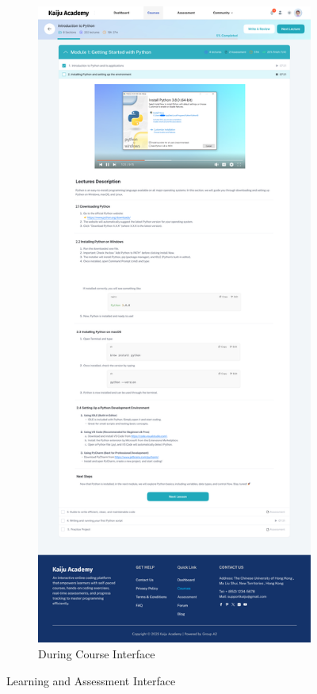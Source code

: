\documentclass[a4paper, 11pt]{scrreprt}
\begin{document}
\begin{figure}[ht]
\begin{subfigure}[b]{0.32\textwidth}
        \includegraphics[width=\textwidth]{UI/During Course.jpg}
        \caption{During Course Interface}
    \end{subfigure}
    
    \caption{Learning and Assessment Interface}
\end{figure}
\end{document}
